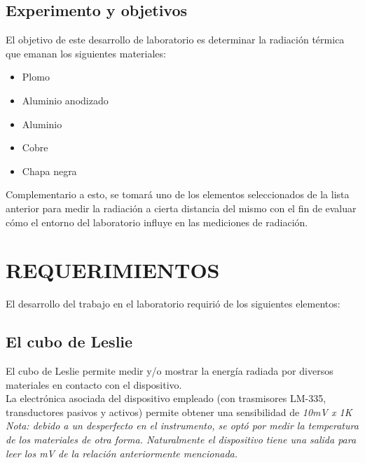 \documentclass[a4paper]{article}
\begin{document}
\begin{multicols}{2}
        \vspace{4.8cm}

        \subsection{Experimento y objetivos}
            \indent El objetivo de este desarrollo de laboratorio es determinar la radiación térmica que emanan los siguientes materiales: \\
            \begin{itemize}
                \setlength{\itemsep}{0pt}
                \item Plomo 
                \item Aluminio anodizado
                \item Aluminio
                \item Cobre 
                \item Chapa negra
            \end{itemize}
        
            \indent Complementario a esto, se tomará uno de los elementos seleccionados de la lista anterior para medir la radiación a cierta distancia del mismo con el fin de evaluar cómo el entorno del laboratorio influye en las mediciones de radiación. \\

     \section{REQUERIMIENTOS}
        El desarrollo del trabajo en el laboratorio requirió de los siguientes elementos:
        \subsection{El cubo de Leslie}
            \indent El cubo de Leslie permite medir y/o mostrar la energía radiada por diversos materiales en contacto con el dispositivo. \\
            \indent La electrónica asociada del dispositivo empleado (con trasmisores LM-335, transductores pasivos y activos) permite obtener una sensibilidad de \textit{10mV x 1\textdegree K} \\
            \indent \textit{Nota: debido a un desperfecto en el instrumento, se optó por medir la temperatura de los materiales de otra forma. Naturalmente el dispositivo tiene una salida para leer los mV de la relación anteriormente mencionada.}

\end{multicols}
\end{document}

